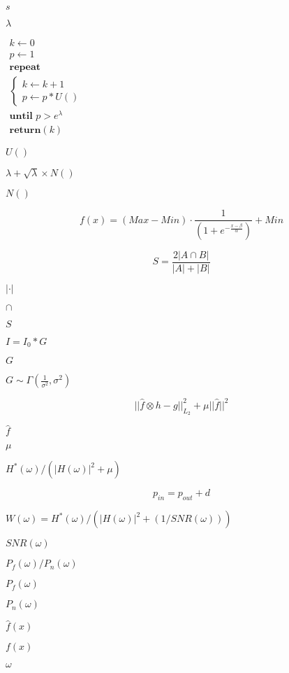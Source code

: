 \documentclass{article}
\begin{document}
$ s $
\pagebreak

$ \lambda $
\pagebreak

$ \begin{array}{l} k \leftarrow 0 \\ p \leftarrow 1 \\ \textbf{repeat} \\ \left\{ \begin{array}{l} k \leftarrow k+1 \\ p \leftarrow p \ast U() \end{array} \right. \\ \textbf{until } p > e^{\lambda} \\ \textbf{return} (k) \end{array} $
\pagebreak

$ U() $
\pagebreak

$ \lambda + \sqrt{\lambda} \times N()$
\pagebreak

$ N() $
\pagebreak

\[ f(x) = (Max-Min) \cdot \frac{1}{\left(1+e^{- \frac{ x - \beta }{\alpha}}\right)} + Min \]
\pagebreak

\[ S = \frac{2 | A \cap B |}{|A| + |B|} \]
\pagebreak

$|\cdot|$
\pagebreak

$\cap$
\pagebreak

$S$
\pagebreak

$ I = I_0 \ast G $
\pagebreak

$ G $
\pagebreak

$ G \sim \Gamma(\frac{1}{\sigma^2}, \sigma^2) $
\pagebreak

\[ ||\hat{f} \otimes h - g||_{L_2}^2 + \mu||\hat{f}||^2 \]
\pagebreak

$\hat{f}$
\pagebreak

$\mu$
\pagebreak

$H^*(\omega) / (|H(\omega)|^2 + \mu)$
\pagebreak

\[ p_{in} = p_{out} + d \]
\pagebreak

$W(\omega) = H^*(\omega) / (|H(\omega)|^2 + (1 / SNR(\omega)))$
\pagebreak

$SNR(\omega)$
\pagebreak

$P_f(\omega) / P_n(\omega)$
\pagebreak

$P_f(\omega)$
\pagebreak

$P_n(\omega)$
\pagebreak

$\hat{f}(x)$
\pagebreak

$f(x)$
\pagebreak

$\omega$
\pagebreak
\end{document}
